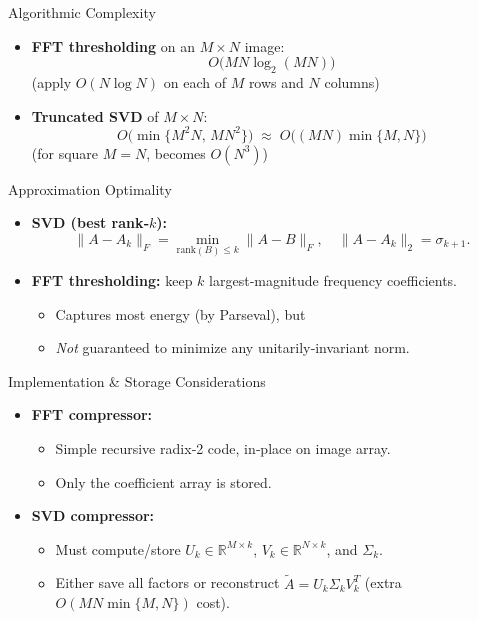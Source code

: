 \documentclass[12pt]{beamer}
\begin{document}
\begin{frame}{Algorithmic Complexity}
  \begin{itemize}
    \item \textbf{FFT thresholding} on an $M\times N$ image:  
      \[
        O\bigl(MN\log_2(MN)\bigr)
      \]
      (apply $O(N\log N)$ on each of $M$ rows and $N$ columns)
    \item \textbf{Truncated SVD} of $M\times N$:  
      \[
        O\bigl(\min\{M^2N,\,MN^2\}\bigr)
        \;\approx\;
        O\bigl((MN)\min\{M,N\}\bigr)
      \]
      (for square $M=N$, becomes $O(N^3)$)
  \end{itemize}
\end{frame}

\begin{frame}{Approximation Optimality}
  \begin{itemize}
    \item \textbf{SVD (best rank‑$k$):}  
      \[
        \|A - A_k\|_F = \min_{\mathrm{rank}(B)\le k}\|A-B\|_F,
        \quad
        \|A - A_k\|_2 = \sigma_{k+1}.
      \]
    \item \textbf{FFT thresholding:} keep $k$ largest‐magnitude frequency coefficients.  
      \begin{itemize}
        \item Captures most energy (by Parseval), but  
        \item \emph{Not} guaranteed to minimize any unitarily‐invariant norm.
      \end{itemize}
  \end{itemize}
\end{frame}

\begin{frame}{Implementation \& Storage Considerations}
  \begin{itemize}
    \item \textbf{FFT compressor:}
      \begin{itemize}
        \item Simple recursive radix‑2 code, in‑place on image array.  
        \item Only the coefficient array is stored.
      \end{itemize}
    \item \textbf{SVD compressor:}
      \begin{itemize}
        \item Must compute/store $U_k\in\mathbb{R}^{M\times k}$, $V_k\in\mathbb{R}^{N\times k}$, and $\Sigma_k$.  
        \item Either save all factors or reconstruct $\tilde A=U_k\Sigma_kV_k^T$ (extra $O(MN\min\{M,N\})$ cost).
      \end{itemize}
  \end{itemize}
\end{frame}
\end{document}
